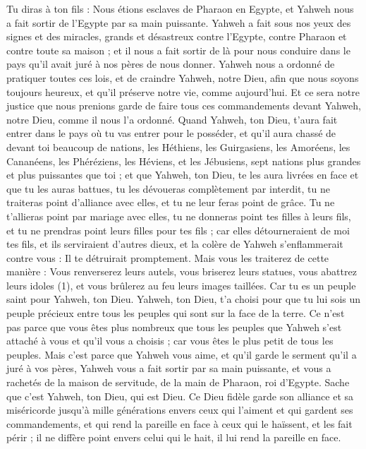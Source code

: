 \begin{multicols}{2}
Tu diras à ton fils : Nous étions esclaves de Pharaon en Egypte, et Yahweh nous a fait sortir de l'Egypte par sa main puissante.
Yahweh a fait sous nos yeux des signes et des miracles, grands et désastreux contre l’Egypte, contre Pharaon et contre toute sa maison ;
et il nous a fait sortir de là pour nous conduire dans le pays qu’il avait juré à nos pères de nous donner.
Yahweh nous a ordonné de pratiquer toutes ces lois, et de craindre Yahweh, notre Dieu, afin que nous soyons toujours heureux, et qu’il préserve notre vie, comme aujourd'hui.
Et ce sera notre justice que nous prenions garde de faire tous ces commandements devant Yahweh, notre Dieu, comme il nous l'a ordonné.
\VerseOne{}Quand Yahweh, ton Dieu, t'aura fait entrer dans le pays où tu vas entrer pour le posséder, et qu'il aura chassé de devant toi beaucoup de nations, les Héthiens, les Guirgasiens, les Amoréens, les Cananéens, les Phéréziens, les Héviens, et les Jébusiens, sept nations plus grandes et plus puissantes que toi ;
et que Yahweh, ton Dieu, te les aura livrées en face et que tu les auras battues, tu les dévoueras complètement par interdit, tu ne traiteras point d’alliance avec elles, et tu ne leur feras point de grâce.
Tu ne t'allieras point par mariage avec elles, tu ne donneras point tes filles à leurs fils, et tu ne prendras point leurs filles pour tes fils ;
car elles détourneraient de moi tes fils, et ils serviraient d'autres dieux, et la colère de Yahweh s'enflammerait contre vous : Il te détruirait promptement.
Mais vous les traiterez de cette manière : Vous renverserez leurs autels, vous briserez leurs statues, vous abattrez leurs idoles (1), et vous brûlerez au feu leurs images taillées.
Car tu es un peuple saint pour Yahweh, ton Dieu. Yahweh, ton Dieu, t'a choisi pour que tu lui sois un peuple précieux entre tous les peuples qui sont sur la face de la terre.
Ce n'est pas parce que vous êtes plus nombreux que tous les peuples que Yahweh s’est attaché à vous et qu’il vous a choisis ; car vous êtes le plus petit de tous les peuples.
Mais c'est parce que Yahweh vous aime, et qu'il garde le serment qu’il a juré à vos pères, Yahweh vous a fait sortir par sa main puissante, et vous a rachetés de la maison de servitude, de la main de Pharaon, roi d'Egypte.
Sache que c'est Yahweh, ton Dieu, qui est Dieu. Ce Dieu fidèle garde son alliance et sa miséricorde jusqu'à mille générations envers ceux qui l'aiment et qui gardent ses commandements,
et qui rend la pareille en face à ceux qui le haïssent, et les fait périr ; il ne diffère point envers celui qui le hait, il lui rend la pareille en face.

\end{multicols}
